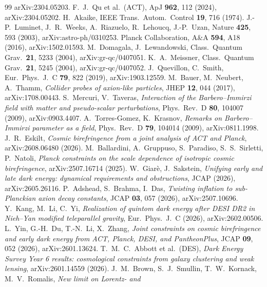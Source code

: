 \documentclass[11pt]{article}
\begin{document}
\begin{thebibliography}{99}
  arXiv:2304.05203.
 F.~J.~Qu et al.\ (ACT), ApJ \textbf{962}, 112 (2024), arXiv:2304.05202.
 H.~Akaike, IEEE Trans.\ Autom.\ Control \textbf{19}, 716 (1974).
 J.-P.~Luminet, J.~R.~Weeks, A.~Riazuelo, R.~Lehoucq, J.-P.~Uzan,
  Nature \textbf{425}, 593 (2003), arXiv:astro-ph/0310253.
 Planck Collaboration, A\&A \textbf{594}, A18 (2016), arXiv:1502.01593.
 M.~Domagala, J.~Lewandowski, Class.\ Quantum Grav.\ \textbf{21}, 5233
  (2004), arXiv:gr-qc/0407051.
 K.~A.~Meissner, Class.\ Quantum Grav.\ \textbf{21}, 5245 (2004),
  arXiv:gr-qc/0407052.
 J.~Quevillon, C.~Smith, Eur.\ Phys.\ J.\ C \textbf{79}, 822 (2019),
  arXiv:1903.12559.
 M.~Bauer, M.~Neubert, A.~Thamm, \emph{Collider probes of axion-like particles}, JHEP
  \textbf{12}, 044 (2017), arXiv:1708.00443.
 S.~Mercuri, V.~Taveras, \emph{Interaction of the Barbero--Immirzi field with matter and
  pseudo-scalar perturbations}, Phys.\ Rev.\ D \textbf{80}, 104007 (2009), arXiv:0903.4407.
 A.~Torres-Gomez, K.~Krasnov, \emph{Remarks on Barbero--Immirzi parameter as a field},
  Phys.\ Rev.\ D \textbf{79}, 104014 (2009), arXiv:0811.1998.
 J.~R.~Eskilt, \emph{Cosmic birefringence from a joint analysis of ACT and Planck},
  arXiv:2608.06480 (2026).
 M.~Ballardini, A.~Gruppuso, S.~Paradiso, S.~S.~Sirletti, P.~Natoli, \emph{Planck
  constraints on the scale dependence of isotropic cosmic birefringence}, arXiv:2507.16714 (2025).
 W.~Giar\`e, J.~Sakstein, \emph{Unifying early and late dark energy: dynamical requirements and
  obstructions}, JCAP (2026), arXiv:2605.26116.
 P.~Adshead, S.~Brahma, I.~Das, \emph{Twisting inflation to sub-Planckian axion decay constants},
  JCAP \textbf{03}, 057 (2026), arXiv:2507.10696.
 Y.~Kang, M.~Li, C.~Yi, \emph{Realization of quintom dark energy after DESI DR2 in Nieh--Yan
  modified teleparallel gravity}, Eur.\ Phys.\ J.\ C (2026), arXiv:2602.00506.
 L.~Yin, G.-H.~Du, T.-N.~Li, X.~Zhang, \emph{Joint constraints on cosmic birefringence and early
  dark energy from ACT, Planck, DESI, and PantheonPlus}, JCAP \textbf{09}, 052 (2026), arXiv:2601.13624.
 T.~M.~C.~Abbott et al.\ (DES), \emph{Dark Energy Survey Year 6 results: cosmological constraints
  from galaxy clustering and weak lensing}, arXiv:2601.14559 (2026).
 J.~M.~Brown, S.~J.~Smullin, T.~W.~Kornack, M.~V.~Romalis, \emph{New limit on Lorentz- and
}
\end{thebibliography}
\end{document}
